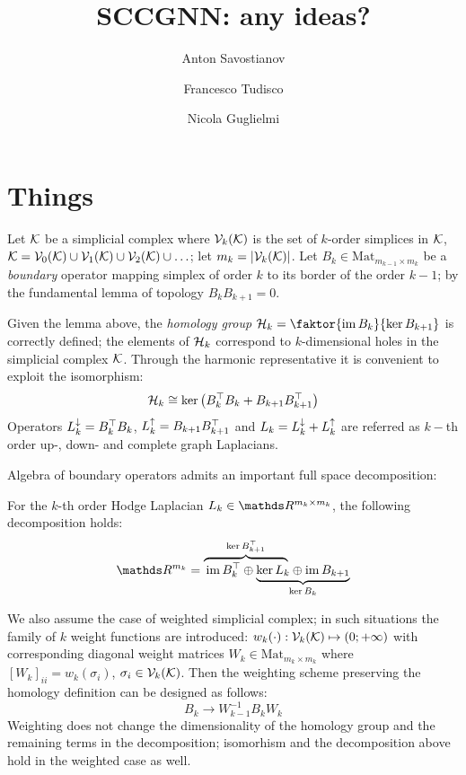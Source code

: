 \documentclass{mynotes}
\title{ SCCGNN: any ideas? }
\author[1]{Anton Savostianov}
\author[1]{Francesco Tudisco}
\author[1]{Nicola Guglielmi}
\affil[1]{Gran Sasso Science Institute, viale F.Crispi 7, L'Aquila, Italy, 67100, email: \email{anton.savostianov@gssi.it} }
\begin{document}
\setlength{\abovedisplayskip}{3pt}
\setlength{\belowdisplayskip}{3pt}

      \maketitle

\section{ Things }

Let \( \mathcal{K} \) be a simplicial complex where \( \mathcal{V}_{k}(\mathcal{K}) \) is the set of \(k\)-order simplices in \( \mathcal{K} \), \( \mathcal{K} = \mathcal{V}_{0}(\mathcal{K}) \cup \mathcal{V}_{1}(\mathcal{K}) \cup \mathcal{V}_{2}(\mathcal{K}) \cup \ldots\); let \( m_k = | \mathcal{V}_{k}(\mathcal{K}) | \). Let \( B_k \in \mathrm{Mat}_{m_{k-1} \times m_k} \) be a \emph{boundary} operator mapping simplex of order \( k \) to its border of the order \( k - 1 \); by the fundamental lemma of topology \( B_k B_{k+1} = 0 \).

Given the lemma above, the \emph{homology group} \( \mc H_k = \faktor{\im B_{k}}{\ker B_{k+1}} \) is correctly defined; the elements of \( \mathcal{H}_k \) correspond to \(k\)-dimensional holes in the simplicial complex \( \mathcal{K} \). Through the harmonic representative it is convenient to exploit the isomorphism:
\begin{equation*}
      \mathcal{H}_k \cong \ker \left( B_k^\top B_k + B_{k+1} B_{k+1}^\top \right)
\end{equation*}
Operators \( L_{k}^{\downarrow} = B_k^\top B_k \), \( L_{k}^{\uparrow} = B_{k+1} B_{k+1}^\top \) and \( L_k = L_{k}^{\downarrow} + L_{k}^{\uparrow} \) are referred as \(k-\)th order up-, down- and complete graph Laplacians.

Algebra of boundary operators admits an important full space decomposition:
\begin{lemma}\label{lem:hodge_decomp}
      For the \(k\)-th order Hodge Laplacian \( L_k \in \ds R^{{m_k} \times {m_k}} \), the following decomposition holds:
      \begin{equation*}
            \ds R^{m_k} = \lefteqn{\overbrace{\phantom{\im B_k^\top \oplus  \ker L_k}}^{\ker B_{k+1}^\top}} \im B_k^\top \oplus
            \underbrace{\ker L_k \oplus  \im B_{k+1}}_{\ker B_k}
      \end{equation*}
\end{lemma}

We also assume the case of weighted simplicial complex; in such situations the family of \( k\) weight functions are introduced: \( w_k(\cdot) : \mathcal{V}_{k}(\mathcal{K}) \mapsto (0; +\infty) \) with corresponding diagonal weight matrices \(W_k \in \mathrm{Mat}_{m_k \times m_k}\) where \( \left[ W_k \right]_{ii} = w_k(\sigma_i) \), \( \sigma_i \in \mathcal{V}_{k}(\mathcal{K}) \). Then the weighting scheme preserving the homology definition can be designed as follows:
\begin{equation*}
      B_k \rightarrow W_{k-1}^{-1} B_k W_k
\end{equation*}
Weighting does not change the dimensionality of the homology group and the remaining terms in the decomposition; isomorhism and the decomposition above hold in the weighted case as well.
\end{document}

